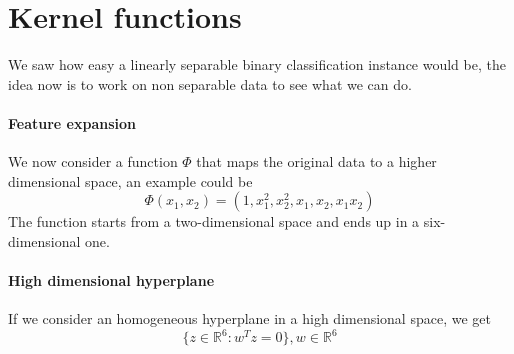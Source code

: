\section{Kernel functions}
We saw how easy a linearly separable binary classification instance 
would be, the idea now is to work on non separable data to see what 
we can do.

\paragraph{Feature expansion}
We now consider a function $\Phi$ that maps the original 
data to a higher dimensional space, an example could be
$$\Phi(x_1, x_2) = (1, x_1^2, x_2^2, x_1, x_2, x_1 x_2)$$
The function starts from a two-dimensional space and ends up 
in a six-dimensional one.

\paragraph{High dimensional hyperplane}
If we consider an homogeneous hyperplane in a high dimensional space, 
we get 
$$\{ z \in \mathbb{R}^6 : w^Tz = 0 \}, w \in \mathbb{R}^6$$
